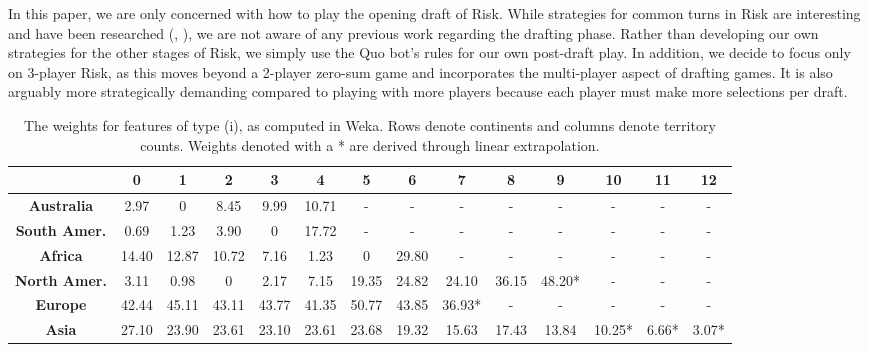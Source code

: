 \documentclass[letterpaper]{article}
\numberwithin{equation}{section}
\numberwithin{theorem}{section}
\numberwithin{lemma}{section}
\numberwithin{df}{section}
\begin{document}
In this paper, we are only concerned with how to play the opening draft of Risk.  While strategies for common turns in Risk are interesting and have been researched (\cite{RiskBots}, \cite{ZuckFelnerKraus2009}), we are not aware of any previous work regarding the drafting phase.  Rather than developing our own strategies for the other stages of Risk, we simply use the Quo bot's rules for our own post-draft play.  In addition, we decide to focus only on 3-player Risk, as this moves beyond a 2-player zero-sum game and incorporates the multi-player aspect of drafting games.  It is also arguably more strategically demanding compared to playing with more players because each player must make more selections per draft.

\begin{table}[t]
 \centering
      \caption{The weights for features of type (i), as computed in Weka.  Rows denote continents and columns denote territory counts.  Weights denoted with a * are derived through linear extrapolation.}
    \label{tab:ContScoring}
    \begin{footnotesize}
    \begin{tabular}{|c|c|c|c|c|c|c|c|c|c|c|c|c|c|}
    	\hline
    	  & \bf 0 & \bf 1 & \bf 2  & \bf 3 & \bf 4 & \bf 5 & \bf 6 & \bf 7 & \bf 8 & \bf 9 & \bf 10 & \bf 11 & \bf 12 \\
    	 \hline
    	\bf Australia & 2.97 & 0 & 8.45 & 9.99 & 10.71 & - & - & - & - & - & - & - & - \\
    	\hline
    	\bf South Amer. & 0.69 & 1.23 & 3.90 & 0 & 17.72 & - & - & - & - & - & - & - & - \\
    	\hline
    	\bf Africa & 14.40 & 12.87 & 10.72 & 7.16 & 1.23 & 0 & 29.80 & - & - & - & - & - & - \\
    	\hline
    	\bf North Amer. & 3.11 & 0.98 & 0 & 2.17 & 7.15 & 19.35 & 24.82 & 24.10 & 36.15 & 48.20* & - & - & - \\
    	\hline
    	\bf Europe & 42.44 & 45.11 & 43.11 & 43.77 & 41.35 & 50.77 & 43.85 & 36.93* & - & - & - & - & - \\
    	\hline
    	\bf Asia & 27.10 & 23.90 & 23.61 & 23.10 & 23.61 & 23.68 & 19.32 & 15.63 & 17.43 & 13.84 & 10.25* & 6.66* & 3.07* \\
    	\hline
    \end{tabular}
    \end{footnotesize}
\end{table}
\end{document}
